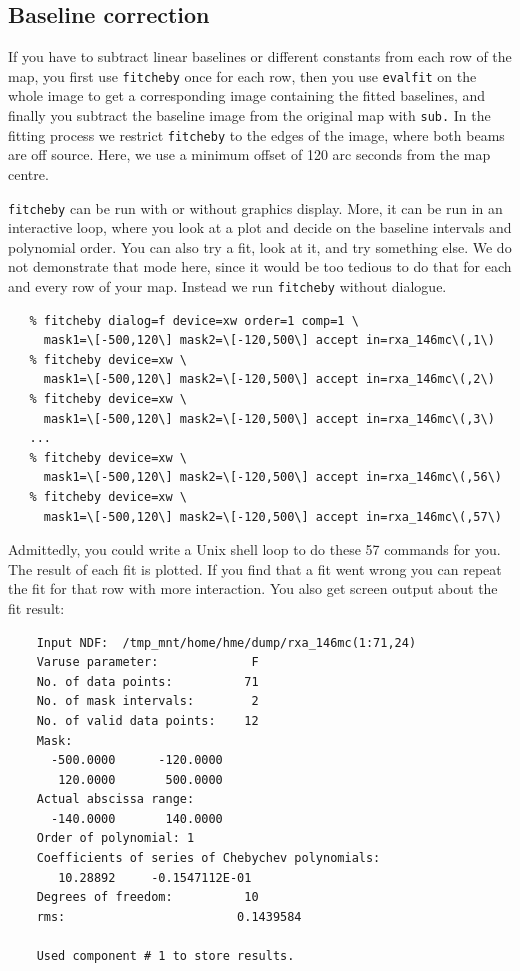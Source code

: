 \documentclass[11pt]{article}
\newcommand{\xref}[3]{#1}
\newcommand{\xlabel}[1]{}
\begin{document}
\subsection{\label{base2}\xlabel{base2}Baseline correction}

   If you have to subtract linear baselines or different constants from
   each row of the map, you first use
{\tt \xref{fitcheby}{sun140}{FITCHEBY}}
   once for each row, then you use
{\tt \xref{evalfit}{sun140}{EVALFIT}}
   on the whole image to get a corresponding image containing the fitted
   baselines, and finally you subtract the baseline image from the
   original map with
{\tt \xref{sub.}{sun95}{SUB}}
   In the fitting process we restrict {\tt fitcheby} to the edges of
   the image, where both beams are off source. Here, we use a minimum
   offset of 120 arc seconds from the map centre.

   {\tt fitcheby} can be run with or without graphics display. More,
   it can be run in an interactive loop, where you look at a plot and
   decide on the baseline intervals and polynomial order. You can also
   try a fit, look at it, and try something else. We do not demonstrate
   that mode here, since it would be too tedious to do that for each and
   every row of your map. Instead we run {\tt fitcheby} without
   dialogue.

\begin{verbatim}
   % fitcheby dialog=f device=xw order=1 comp=1 \
     mask1=\[-500,120\] mask2=\[-120,500\] accept in=rxa_146mc\(,1\)
   % fitcheby device=xw \
     mask1=\[-500,120\] mask2=\[-120,500\] accept in=rxa_146mc\(,2\)
   % fitcheby device=xw \
     mask1=\[-500,120\] mask2=\[-120,500\] accept in=rxa_146mc\(,3\)
   ...
   % fitcheby device=xw \
     mask1=\[-500,120\] mask2=\[-120,500\] accept in=rxa_146mc\(,56\)
   % fitcheby device=xw \
     mask1=\[-500,120\] mask2=\[-120,500\] accept in=rxa_146mc\(,57\)
\end{verbatim}

   Admittedly, you could write a Unix shell loop to do these 57 commands for
   you. The result of each fit is plotted. If you find that a fit went wrong
   you can repeat the fit for that row with more interaction. You also get
   screen output about the fit result:

\begin{verbatim}
    Input NDF:  /tmp_mnt/home/hme/dump/rxa_146mc(1:71,24)
    Varuse parameter:             F
    No. of data points:          71
    No. of mask intervals:        2
    No. of valid data points:    12
    Mask:
      -500.0000      -120.0000
       120.0000       500.0000
    Actual abscissa range:
      -140.0000       140.0000
    Order of polynomial: 1
    Coefficients of series of Chebychev polynomials:
       10.28892     -0.1547112E-01
    Degrees of freedom:          10
    rms:                        0.1439584

    Used component # 1 to store results.
\end{verbatim}
\end{document}
